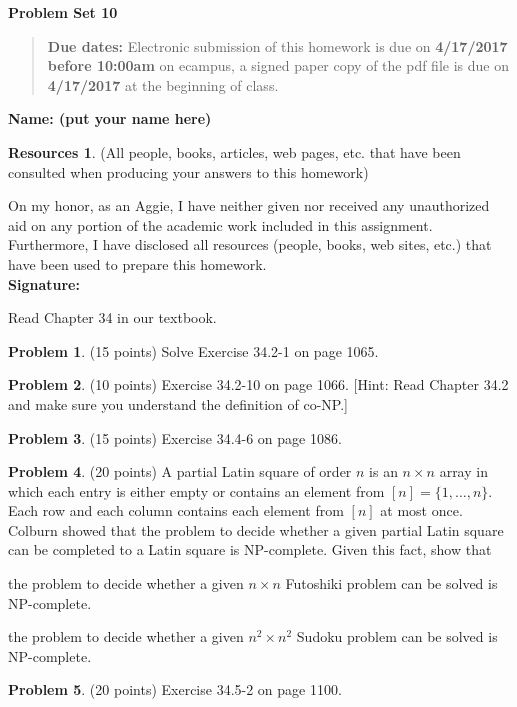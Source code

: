 \documentclass{article}
\theoremstyle{definition}
\newtheorem{problem}{Problem}
\newtheorem*{resources}{Resources}
\newcommand{\name}[1]{\noindent\textbf{Name: #1}}
\newcommand{\honor}{\noindent On my honor, as an Aggie, I have neither
  given nor received any unauthorized aid on any portion of the
  academic work included in this assignment. Furthermore, I have
  disclosed all resources (people, books, web sites, etc.) that have
  been used to prepare this homework. \\[1ex]
 \textbf{Signature:} \underline{\hspace*{5cm}} }
\newcommand{\problemset}[1]{\begin{center}\textbf{Problem Set #1}\end{center}}
\newcommand{\duedate}[2]{\begin{quote}\textbf{Due dates:} Electronic
    submission of this homework is due on \textbf{#1} on ecampus, a
    signed paper copy of the pdf file is due on \textbf{#2} at the
    beginning of class. \end{quote} }
\begin{document}
\problemset{10}
\duedate{4/17/2017 before 10:00am}{4/17/2017}
\name{ (put your name here)}
\begin{resources} (All people, books, articles, web pages, etc. that
  have been consulted when producing your answers to this homework)
\end{resources}
\honor

\newpage

Read Chapter 34 in our textbook. 


\begin{problem} (15 points) %
Solve Exercise 34.2-1 on page 1065. 
\end{problem}

\begin{problem} (10 points) %
Exercise 34.2-10 on page 1066. [Hint: Read Chapter 34.2 and make sure you
understand the definition of co-NP.]  
\end{problem}

\begin{problem} (15 points) %
Exercise 34.4-6 on page 1086. 
\end{problem}

\begin{problem} (20 points) 
A partial Latin square of order $n$ is an $n\times n$ array in which
each entry is either empty or contains an element from $[n] = \{1,\ldots,
n\}$. Each row and each column contains each element from $[n]$ at
most once. Colburn showed that the problem to decide whether a given
partial Latin square can be completed to a Latin square is
NP-complete. Given this fact, show that 
\begin{compactenum}[(a)]
\item the problem to decide whether a given $n\times n$ Futoshiki
  problem can be solved is NP-complete. 
\item the problem to decide whether a given $n^2\times n^2$ Sudoku 
  problem can be solved is NP-complete. 
\end{compactenum}
\end{problem}

\begin{problem} (20 points) %
Exercise 34.5-2 on page 1100. 
\end{problem}
\end{document}
